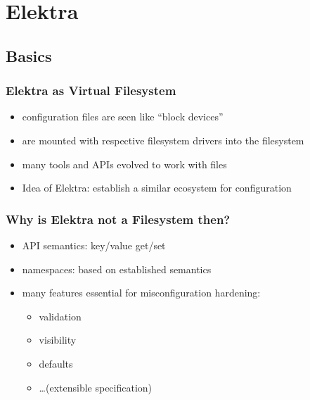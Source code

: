 

\date{29.01.2020}



\renewcommand{\enquote}[1]{\emph{``#1''}} %

\begin{frame}
	\titlepage
	\doclicenseThis
\end{frame}




\section{Elektra}

\subsection{Basics}

\begin{frame}
	\frametitle{Elektra as Virtual Filesystem}
	\begin{itemize}
	\item configuration files are seen like ``block devices''
	\item are mounted with respective filesystem drivers into the filesystem
	\item many tools and APIs evolved to work with files
	\item Idea of Elektra: establish a similar ecosystem for configuration
	\end{itemize}
\end{frame}

\begin{frame}
	\frametitle{Why is Elektra not a Filesystem then?}
	\begin{itemize}
	\item API semantics: key/value get/set
	\item namespaces: based on established semantics
	\item many features essential for misconfiguration hardening:
		\begin{itemize}
		\item validation
		\item visibility
		\item defaults
		\item \dots (extensible specification)
		\end{itemize}
	\end{itemize}
\end{frame}

